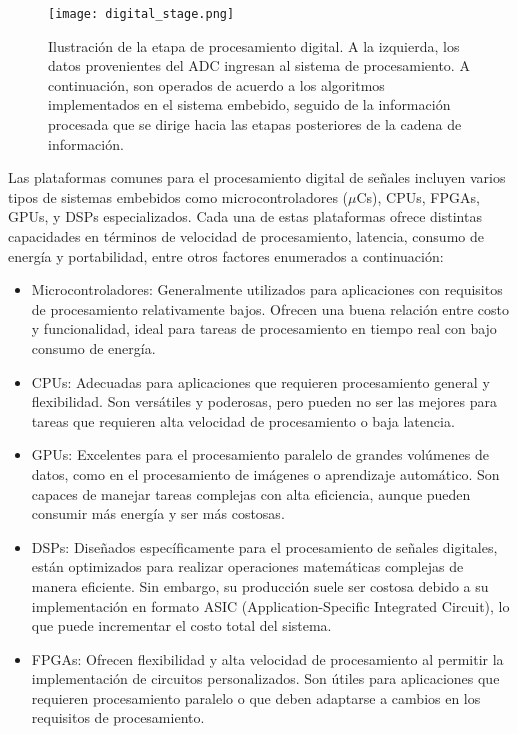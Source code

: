 \documentclass{report}
\begin{document}
\begin{figure}[h]
    \centering
    \texttt{[image: digital\_stage.png]}
    \caption{Ilustración de la etapa de procesamiento digital. A la izquierda, los datos provenientes del ADC ingresan al sistema de procesamiento. A continuación, son operados de acuerdo a los algoritmos implementados en el sistema embebido, seguido de la información procesada que se dirige hacia las etapas posteriores de la cadena de información.}
    \label{fig:digital_stage}
\end{figure}

\noindent Las plataformas comunes para el procesamiento digital de señales incluyen varios tipos de sistemas embebidos como microcontroladores ($\mu$Cs), CPUs, FPGAs, GPUs, y DSPs especializados. Cada una de estas plataformas ofrece distintas capacidades en términos de velocidad de procesamiento, latencia, consumo de energía y portabilidad, entre otros factores enumerados a continuación\cite{meyer2007digital}:

\begin{itemize}
    \item  Microcontroladores: Generalmente utilizados para aplicaciones con requisitos de procesamiento relativamente bajos. Ofrecen una buena relación entre costo y funcionalidad, ideal para tareas de procesamiento en tiempo real con bajo consumo de energía.
    \item  CPUs: Adecuadas para aplicaciones que requieren procesamiento general y flexibilidad. Son versátiles y poderosas, pero pueden no ser las mejores para tareas que requieren alta velocidad de procesamiento o baja latencia.
    \item GPUs: Excelentes para el procesamiento paralelo de grandes volúmenes de datos, como en el procesamiento de imágenes o aprendizaje automático. Son capaces de manejar tareas complejas con alta eficiencia, aunque pueden consumir más energía y ser más costosas.
    \item DSPs: Diseñados específicamente para el procesamiento de señales digitales, están optimizados para realizar operaciones matemáticas complejas de manera eficiente. Sin embargo, su producción suele ser costosa debido a su implementación en formato ASIC (Application-Specific Integrated Circuit), lo que puede incrementar el costo total del sistema.
    \item FPGAs: Ofrecen flexibilidad y alta velocidad de procesamiento al permitir la implementación de circuitos personalizados. Son útiles para aplicaciones que requieren procesamiento paralelo o que deben adaptarse a cambios en los requisitos de procesamiento.
\end{itemize}
\end{document}

